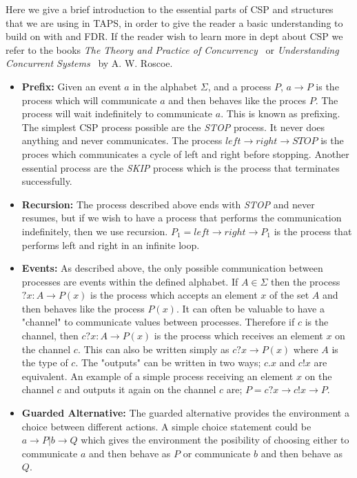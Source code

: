 Here we give a brief introduction to the essential parts of CSP and structures that we are using in TAPS, in order to give the reader a basic understanding to build on with \cspm{} and FDR. If the reader wish to learn more in dept about CSP we refer to the books \textit{The Theory and Practice of Concurrency}~\cite{Roscoe1997} or \textit{Understanding Concurrent Systems}~\cite{Roscoe2010} by A. W. Roscoe.
\begin{itemize}
    \item \textbf{Prefix:} Given an event $a$ in the alphabet $\Sigma$, and a process $P$, $a \rightarrow P$ is the process which will communicate $a$ and then behaves like the proces $P$. The process will wait indefinitely to communicate $a$. This is known as prefixing.\\
    The simplest CSP process possible are the \textit{STOP} process. It never does anything and never communicates. The process $left \rightarrow right \rightarrow STOP$ is the proces which communicates a cycle of left and right before stopping. Another essential process are the \textit{SKIP} process which is the process that terminates successfully.
    \item \textbf{Recursion:} The process described above ends with \textit{STOP} and never resumes, but if we wish to have a process that performs the communication indefinitely, then we use recursion.
    $P_1 = left \rightarrow right \rightarrow P_1$ is the process that performs left and right in an infinite loop.
    \item \textbf{Events:} As described above, the only possible communication between processes are events within the defined alphabet. If $A \in \Sigma$ then the process $?x : A \rightarrow P(x)$ is the process which accepts an element $x$ of the set $A$ and then behaves like the process $P(x)$.
    It can often be valuable to have a "channel" to communicate values between processes. Therefore if $c$ is the channel, then $c?x : A \rightarrow P(x)$ is the process which receives an element $x$ on the channel $c$. This can also be written simply as $c?x \rightarrow P(x)$ where $A$ is the type of $c$. The "outputs" can be written in two ways; $c.x$ and $c!x$ are equivalent. An example of a simple process receiving an element $x$ on the channel $c$ and outputs it again on the channel $c$ are; $P = c?x \rightarrow c!x \rightarrow P$.
    \item \textbf{Guarded Alternative:} The guarded alternative provides the environment a choice between different actions. A simple choice statement could be $a \rightarrow P | b \rightarrow Q$ which gives the environment the posibility of choosing either to communicate $a$ and then behave as $P$ or communicate $b$ and then behave as $Q$.

\end{itemize}
